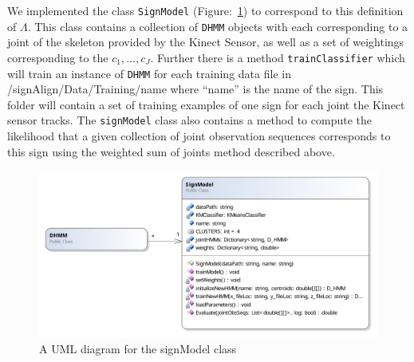 We implemented the class \verb|SignModel| (Figure:~\ref{fig:signModel}) to correspond to this definition of $\Lambda$. This class contains a collection of \verb|DHMM| objects with each corresponding to a joint of the skeleton provided by the Kinect Sensor, as well as a set of weightings corresponding to the $c_1, \dots , c_J$. Further there is a method \verb|trainClassifier| which will train an instance of \verb|DHMM| for each training data file in  /signAlign/Data/Training/name where ``name'' is the name of the sign. This folder will contain a set of training examples of one sign for each joint the Kinect sensor tracks. The \verb|signModel| class also contains a method to compute the likelihood that a given collection of joint observation sequences corresponds to this sign using the weighted sum of joints method described above.
\begin{figure}
        \centering
        \includegraphics[width=1.03\textwidth]{ThesisFigs/signModelDiag}
        \caption{A UML diagram for the signModel class}\label{fig:signModel}
\end{figure}

